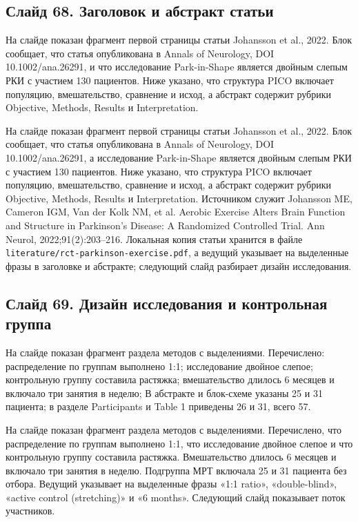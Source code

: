 \documentclass[11pt,a4paper]{article}
\begin{document}
\subsection*{Слайд 68. Заголовок и абстракт статьи}
\begin{onslide}
На слайде показан фрагмент первой страницы статьи Johansson et al., 2022. Блок сообщает, что статья опубликована в Annals of Neurology, DOI 10.1002/ana.26291, и что исследование Park-in-Shape является двойным слепым РКИ с участием 130 пациентов. Ниже указано, что структура PICO включает популяцию, вмешательство, сравнение и исход, а абстракт содержит рубрики Objective, Methods, Results и Interpretation.
\end{onslide}
На слайде показан фрагмент первой страницы статьи Johansson et al., 2022. Блок сообщает, что статья опубликована в Annals of Neurology, DOI 10.1002/ana.26291, а исследование Park-in-Shape является двойным слепым РКИ с участием 130 пациентов. Ниже указано, что структура PICO включает популяцию, вмешательство, сравнение и исход, а абстракт содержит рубрики Objective, Methods, Results и Interpretation. Источником служит Johansson ME, Cameron IGM, Van der Kolk NM, et al. Aerobic Exercise Alters Brain Function and Structure in Parkinson's Disease: A Randomized Controlled Trial. Ann Neurol, 2022;91(2):203--216. Локальная копия статьи хранится в файле \texttt{literature/rct-parkinson-exercise.pdf}, а ведущий указывает на выделенные фразы в заголовке и абстракте; следующий слайд разбирает дизайн исследования.

\subsection*{Слайд 69. Дизайн исследования и контрольная группа}
\begin{onslide}
На слайде показан фрагмент раздела методов с выделениями. Перечислено: распределение по группам выполнено 1:1; исследование двойное слепое; контрольную группу составила растяжка; вмешательство длилось 6 месяцев и включало три занятия в неделю; В абстракте и блок-схеме указаны 25 и 31 пациента; в разделе Participants и Table 1 приведены 26 и 31, всего 57.
\end{onslide}
На слайде показан фрагмент раздела методов с выделениями. Перечислено, что распределение по группам выполнено 1:1, что исследование двойное слепое и что контрольную группу составила растяжка. Вмешательство длилось 6 месяцев и включало три занятия в неделю. Подгруппа МРТ включала 25 и 31 пациента без отбора. Ведущий указывает на выделенные фразы «1:1 ratio», «double-blind», «active control (stretching)» и «6 months». Следующий слайд показывает поток участников.
\end{document}
